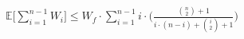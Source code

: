 \documentclass[preview]{standalone}
\begin{document}
\begin{align*}
\mathbb{E} \Bigg[ \sum_{i=1}^{n-1} W_i \Bigg] \leq W_f \cdot \sum_{i=1}^{n-1} i \cdot \bigg( \frac{\binom{n}{2} + 1}{i \cdot (n-i) + \binom{i}{2} + 1} \bigg)
\end{align*}
\end{document}
